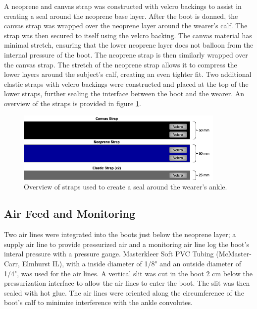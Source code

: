 \documentclass[defaultstyle,11pt]{comps}
\begin{document}
A neoprene and canvas strap was constructed with velcro backings to assist in creating a seal around the neoprene base layer.
After the boot is donned, the canvas strap was wrapped over the neoprene layer around the wearer's calf.
The strap was then secured to itself using the velcro backing.
The canvas material has minimal stretch, ensuring that the lower neoprene layer does not balloon from the internal pressure of the boot.
The neoprene strap is then similarly wrapped over the canvas strap.
The stretch of the neoprene strap allows it to compress the lower layers around the subject's calf, creating an even tighter fit.
Two additional elastic straps with velcro backings were constructed and placed at the top of the lower straps, further sealing the interface between the boot and the wearer.
An overview of the straps is provided in figure \ref{fig:SA4-straps}.

\begin{figure}
\hypertarget{fig:SA4-straps}{%
\centering
\includegraphics[width=0.9\textwidth,height=\textheight]{../fig/SA4/Straps.png}
\caption{Overview of straps used to create a seal around the wearer's ankle.}\label{fig:SA4-straps}
}
\end{figure}

\hypertarget{air-feed-and-monitoring}{%
\subsection{Air Feed and Monitoring}\label{air-feed-and-monitoring}}

Two air lines were integrated into the boots just below the neoprene layer; a supply air line to provide pressurized air and a monitoring air line log the boot's interal pressure with a pressure gauge.
Masterkleer Soft PVC Tubing (McMaster-Carr, Elmhurst IL), with a inside diameter of 1/8" and an outside diameter of 1/4", was used for the air lines.
A vertical slit was cut in the boot 2 cm below the pressurization interface to allow the air lines to enter the boot.
The slit was then sealed with hot glue.
The air lines were oriented along the circumference of the boot's calf to minimize interference with the ankle convolutes.
\end{document}
